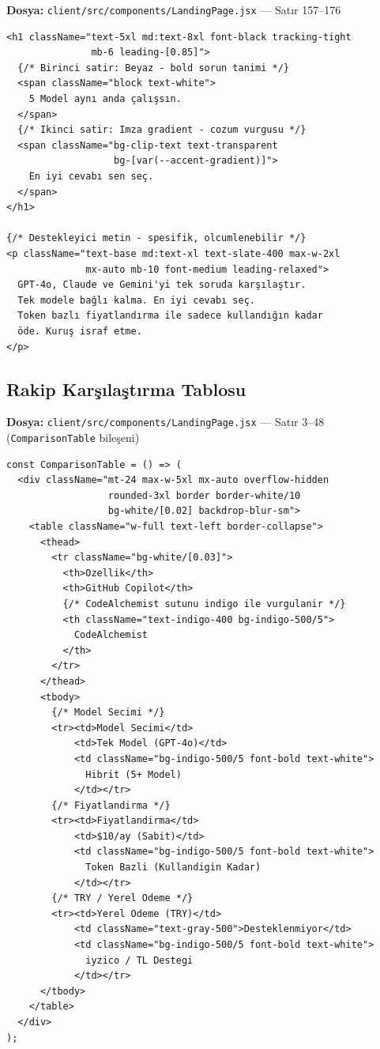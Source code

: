 \documentclass[12pt,a4paper]{article}
\begin{document}
\textbf{Dosya:} \texttt{client/src/components/LandingPage.jsx} — Satır 157--176

\begin{lstlisting}[language=JSX, caption={Fayda Temelli Hero Baslik - LandingPage.jsx:157}]
<h1 className="text-5xl md:text-8xl font-black tracking-tight
               mb-6 leading-[0.85]">
  {/* Birinci satir: Beyaz - bold sorun tanimi */}
  <span className="block text-white">
    5 Model aynı anda çalışsın.
  </span>
  {/* Ikinci satir: Imza gradient - cozum vurgusu */}
  <span className="bg-clip-text text-transparent
                   bg-[var(--accent-gradient)]">
    En iyi cevabı sen seç.
  </span>
</h1>

{/* Destekleyici metin - spesifik, olcumlenebilir */}
<p className="text-base md:text-xl text-slate-400 max-w-2xl
              mx-auto mb-10 font-medium leading-relaxed">
  GPT-4o, Claude ve Gemini'yi tek soruda karşılaştır.
  Tek modele bağlı kalma. En iyi cevabı seç.
  Token bazlı fiyatlandırma ile sadece kullandığın kadar
  öde. Kuruş israf etme.
</p>
\end{lstlisting}

\subsection{Rakip Karşılaştırma Tablosu}

\textbf{Dosya:} \texttt{client/src/components/LandingPage.jsx} — Satır 3--48 (\texttt{ComparisonTable} bileşeni)

\begin{lstlisting}[language=JSX, caption={Rakip Karsilastirma Tablosu - LandingPage.jsx:3}]
const ComparisonTable = () => (
  <div className="mt-24 max-w-5xl mx-auto overflow-hidden
                  rounded-3xl border border-white/10
                  bg-white/[0.02] backdrop-blur-sm">
    <table className="w-full text-left border-collapse">
      <thead>
        <tr className="bg-white/[0.03]">
          <th>Ozellik</th>
          <th>GitHub Copilot</th>
          {/* CodeAlchemist sutunu indigo ile vurgulanir */}
          <th className="text-indigo-400 bg-indigo-500/5">
            CodeAlchemist
          </th>
        </tr>
      </thead>
      <tbody>
        {/* Model Secimi */}
        <tr><td>Model Secimi</td>
            <td>Tek Model (GPT-4o)</td>
            <td className="bg-indigo-500/5 font-bold text-white">
              Hibrit (5+ Model)
            </td></tr>
        {/* Fiyatlandirma */}
        <tr><td>Fiyatlandirma</td>
            <td>$10/ay (Sabit)</td>
            <td className="bg-indigo-500/5 font-bold text-white">
              Token Bazli (Kullandigin Kadar)
            </td></tr>
        {/* TRY / Yerel Odeme */}
        <tr><td>Yerel Odeme (TRY)</td>
            <td className="text-gray-500">Desteklenmiyor</td>
            <td className="bg-indigo-500/5 font-bold text-white">
              iyzico / TL Destegi
            </td></tr>
      </tbody>
    </table>
  </div>
);
\end{lstlisting}
\end{document}
